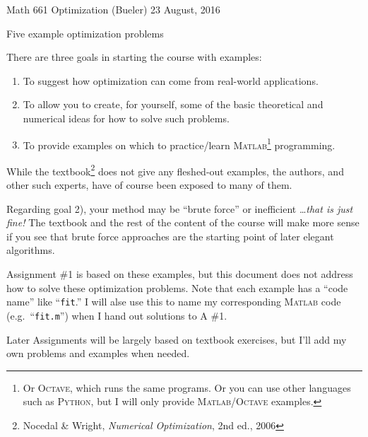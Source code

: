 \documentclass[11pt]{amsart}
\newcommand{\Matlab}{\textsc{Matlab}\xspace}
\newcommand{\Octave}{\textsc{Octave}\xspace}
\newcommand{\Python}{\textsc{Python}\xspace}
\begin{document}
\scriptsize \noindent Math 661 Optimization (Bueler) \hfill 23 August, 2016
\normalsize

\medskip\bigskip
\Large
\centerline{Five example optimization problems}

\bigskip\medskip
\normalsize

\thispagestyle{empty}

There are three goals in starting the course with examples:
\renewcommand{\labelenumi}{\arabic{enumi})}
\begin{enumerate}
\item To suggest how optimization can come from real-world applications.
\item To allow you to create, for yourself, some of the basic theoretical and numerical ideas for how to solve such problems.
\item To provide examples on which to practice/learn \Matlab\footnote{Or \Octave, which runs the same programs.  Or you can use other languages such as \Python, but I will only provide \Matlab/\Octave examples.} programming.
\end{enumerate}
While the textbook\footnote{Nocedal \& Wright, \emph{Numerical Optimization}, 2nd ed., 2006} does not give any fleshed-out examples, the authors, and other such experts, have of course been exposed to many of them.

Regarding goal 2), your method may be ``brute force'' or inefficient \dots \emph{that is just fine!}  The textbook and the rest of the content of the course will make more sense if you see that brute force approaches are the starting point of later elegant algorithms.

Assignment \#1 is based on these examples, but this document does not address how to solve these optimization problems.  Note that each example has a ``code name'' like ``\texttt{fit}.''  I will alse use this to name my corresponding \Matlab code (e.g.~``\texttt{fit.m}'') when I hand out solutions to A \#1.

Later Assignments will be largely based on textbook exercises, but I'll add my own problems and examples when needed.
\end{document}
